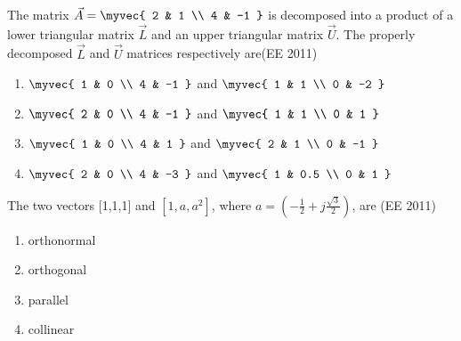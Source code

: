 \item The matrix $\vec{A} =\myvec{ 2 & 1 \\ 4 & -1 } $ is decomposed into a product of a lower triangular matrix $\vec{L}$ and an upper triangular matrix $\vec{U}$. The properly decomposed $\vec{L}$ and $\vec{U}$ matrices respectively are\hfill{(EE 2011)}
\begin{multicols}{2}
\begin{enumerate}
\item $\myvec{ 1 & 0 \\ 4 & -1 }$ and $\myvec{ 1 & 1 \\ 0 & -2 }$
\item $\myvec{ 2 & 0 \\ 4 & -1 }$ and $\myvec{ 1 & 1 \\ 0 & 1 }$
\item$\myvec{ 1 & 0 \\ 4 & 1 }$ and $\myvec{ 2 & 1 \\ 0 & -1 }$
\item $\myvec{ 2 & 0 \\ 4 & -3 }$ and $\myvec{ 1 & 0.5 \\ 0 & 1 }$
\end{enumerate}
\end{multicols}
\item The two vectors [1,1,1] and $[1,a,a^2]$, where  $a =\left(
    -\frac{1}{2} + j \frac{\sqrt{3}}{2}
\right)$,
 are \hfill{(EE 2011)}
\begin{multicols}{4}
\begin{enumerate}
  \item orthonormal
  \item orthogonal
  \item parallel
  \item collinear
\end{enumerate}
\end{multicols}
